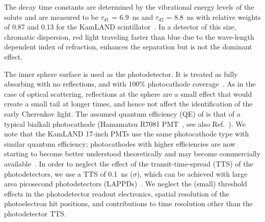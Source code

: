 The decay time constants are determined by the vibrational energy
levels of the solute and are measured to be $\tau_{d1}$ = 6.9~ns and
$\tau_{d2}$ = 8.8~ns with relative weights of 0.87 and 0.13 for the
KamLAND scintillator~\cite{tajimaThesis}. In a detector of this size,
chromatic dispersion, red light traveling faster than blue due to the
wave-length dependent index of refraction, enhances the separation but
is not the dominant effect.

The inner sphere surface is used as the photodetector. It is treated
as fully absorbing with no reflections, and with 100\% photocathode
coverage~\cite{Juno_coverage}. As in the case of optical scattering,
reflections at the sphere are a small effect that would create a small
tail at longer times, and hence not affect the identification of the
early Cherenkov light. The assumed quantum efficiency (QE) of is that
of a typical bialkali photocathode (Hamamatsu R7081
PMT~\cite{Hamamatsu_R7081}, see also Ref.~\cite{dctwo}). We note that
the KamLAND 17-inch PMTs use the same photocathode type with similar
quantum efficiency; photocathodes with higher efficiencies are now
starting to become better understood theoretically and may become
commercially available~\cite{Photonis, Smedley, Luca}.  In order to
neglect the effect of the transit-time-spread (TTS) of the
photodetectors, we use a TTS of 0.1~ns ($\sigma$), which can be
achieved with large area picosecond photodetectors
(LAPPDs)~\cite{anode_paper,PSEC4_paper,RSI_paper,Vienna2013,Ceramic_paper1,HV_paper,Timing_paper,Incom_paper}.
We neglect the (small) threshold effects in the photodetector readout
electronics, spatial resolution of the photoelectron hit positions,
and contributions to time resolution other than the photodetector TTS.

